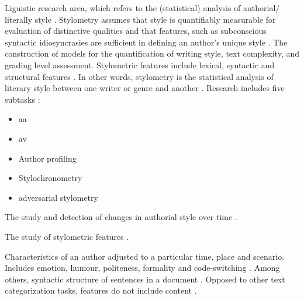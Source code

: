 \begin{definition}
    [Stylometry]
    Liguistic research area, which refers to the (statistical) analysis of authorial/ literally style \cite{elmanarelbouanani_authorship_2014,neal_surveying_2018}.
    Stylometry assumes that style is quantifiably measurable for evaluation of distinctive qualities and 
    that features, such as subconscious syntactic idiosyncrasies are sufficient in defining an author's unique style \cite{neal_surveying_2018}.
    The construction of models for the quantification of writing style, text complexity, and grading level assessment.
    Stylometric features include lexical, syntactic and structural features \cite{stein_intrinsic_2011}.
    In other words, stylometry is the statistical analysis of literary style between one writer or genre and another \cite{tyo_state_2022}.
    Research includes five subtasks \cite{neal_surveying_2018}:
    \begin{itemize}
        \item \ac{aa}
        \item \ac{av}
        \item Author profiling
        \item Stylochronometry
        \item adversarial stylometry
    \end{itemize}
\end{definition}

\begin{definition}
    [Stylochronometry]
    The study and detection of changes in authorial style over time \cite{neal_surveying_2018}.
\end{definition}

\begin{definition}
    [Stylistics]
    The study of stylometric features \cite{elmanarelbouanani_authorship_2014,abbasi_writeprints_2008}.
\end{definition}

\begin{definition}
    Characteristics of an author adjusted to a particular time, place and scenario.
    Includes emotion, humour, politeness, formality and code-switching \cite{gohsen_task_oriented_2024}.
    Among others, syntactic structure of sentences in a document \cite{jafariakinabad_self_supervised_2022}.
    Opposed to other text categorization tasks, features do not include content \cite{koppel_authorship_2004,gohsen_task_oriented_2024}.
\end{definition}


